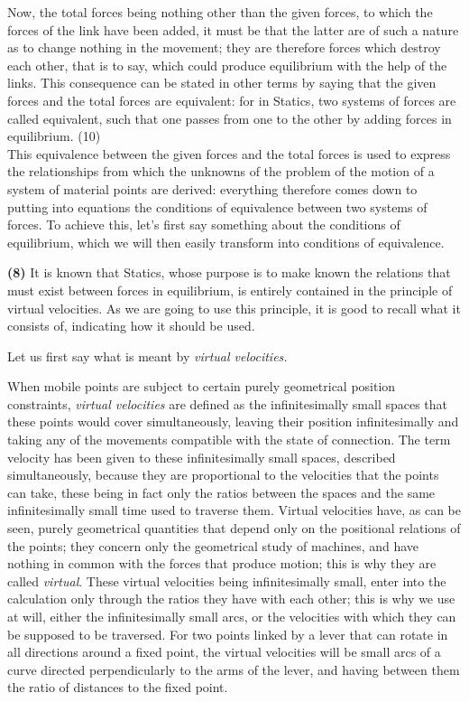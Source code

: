 \documentclass{book}
\begin{document}
Now, the total forces being nothing other than the given forces, to which the forces of the link have been added, it must be that the latter are of such a nature as to change nothing in the movement; they are therefore forces which destroy each other, that is to say, which could produce equilibrium with the help of the links. This consequence can be stated in other terms by saying that the given forces and the total forces are equivalent: for in Statics, two systems of forces are called equivalent, such that one passes from one to the other by adding forces in equilibrium.
\newpage
(10)\\
This equivalence between the given forces and the total forces is used to express the relationships from which the unknowns of the problem of the motion of a system of material points are derived: everything therefore comes down to putting into equations the conditions of equivalence between two systems of forces. To achieve this, let's first say something about the conditions of equilibrium, which we will then easily transform into conditions of equivalence.

\textbf{(8)} It is known that Statics, whose purpose is to make known the relations that must exist between forces in equilibrium, is entirely contained in the principle of virtual velocities. As we are going to use this principle, it is good to recall what it consists of, indicating how it should be used.

Let us first say what is meant by \textit{virtual velocities.}

When mobile points are subject to certain purely geometrical position constraints, \textit{virtual velocities} are defined as the infinitesimally small spaces that these points would cover simultaneously, leaving their position infinitesimally and taking any of the movements compatible with the state of connection. The term velocity has been given to these infinitesimally small spaces, described simultaneously, because they are proportional to the velocities that the points can take, these being in fact only the ratios between the spaces and the same infinitesimally small time used to traverse them. Virtual velocities have, as can be seen, purely geometrical quantities that depend only on the positional relations of the points; they concern only the geometrical study of machines, and have nothing in common with the forces that produce motion; this is why they are called \textit{virtual}. These virtual velocities being infinitesimally small, enter into the calculation only through the ratios they have with each other; this is why we use at will, either the infinitesimally small arcs, or the velocities with which they can be supposed to be traversed. For two points linked by a lever that can rotate in all directions around a fixed point, the virtual velocities will be small arcs of a curve directed perpendicularly to the arms of the lever, and having between them the ratio of distances to the fixed point.
\end{document}
